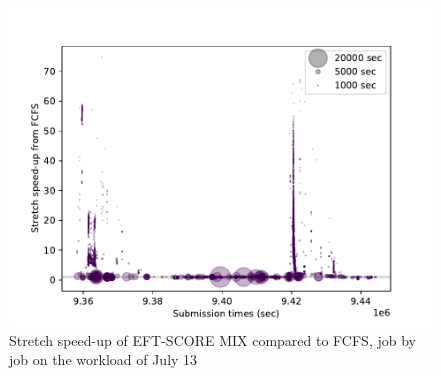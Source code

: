 \documentclass[conference,10pt]{IEEEtran}
\begin{document}
\begin{figure}\centering\includegraphics[width=1\linewidth]{../MBSS/plot/Stretch_times_FCFS_EFT-SCORE-MIX_2022-07-13->2022-07-13_V10000_450_128_32_256_4_1024.pdf}\caption{Stretch speed-up of EFT-SCORE MIX compared to FCFS, job by job on the workload of July 13}\end{figure}
\end{document}
